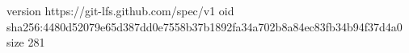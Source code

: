 version https://git-lfs.github.com/spec/v1
oid sha256:4480d52079e65d387dd0e7558b37b1892fa34a702b8a84ec83fb34b94f37d4a0
size 281

